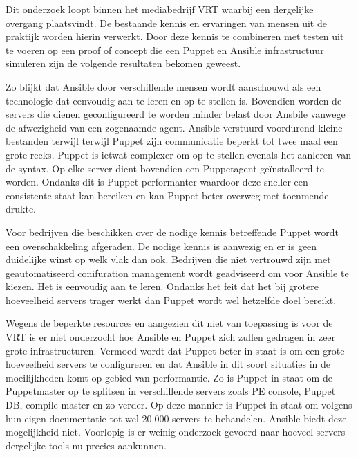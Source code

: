 Dit onderzoek loopt binnen het mediabedrijf VRT waarbij een dergelijke overgang plaatsvindt. De bestaande kennis en ervaringen van mensen uit de praktijk worden hierin verwerkt. Door deze kennis te combineren met testen uit te voeren op een proof of concept die een Puppet en Ansible infrastructuur simuleren zijn de volgende resultaten bekomen geweest.

Zo blijkt dat Ansible door verschillende mensen wordt aanschouwd als een technologie dat eenvoudig aan te leren en op te stellen is. Bovendien worden de servers die dienen geconfigureerd te worden minder belast door Ansbile vanwege de afwezigheid van een zogenaamde agent. Ansible verstuurd voordurend kleine bestanden terwijl terwijl Puppet zijn communicatie beperkt tot twee maal een grote reeks. Puppet is ietwat complexer om op te stellen evenals het aanleren van de syntax. Op elke server dient bovendien een Puppetagent ge\"installeerd te worden. Ondanks dit is Puppet performanter waardoor deze sneller een consistente staat kan bereiken en kan Puppet beter overweg met toenmende drukte.

Voor bedrijven die beschikken over de nodige kennis betreffende Puppet wordt een overschakkeling afgeraden. De nodige kennis is aanwezig en er is geen duidelijke winst op welk vlak dan ook. Bedrijven die niet vertrouwd zijn met geautomatiseerd conifuration management wordt geadviseerd om voor Ansible te kiezen. Het is eenvoudig aan te leren. Ondanks het feit dat het bij grotere hoeveelheid servers trager werkt dan Puppet wordt wel hetzelfde doel bereikt.


Wegens de beperkte resources en aangezien dit niet van toepassing is voor de VRT is er niet onderzocht hoe Ansible en Puppet zich zullen gedragen in zeer grote infrastructuren. Vermoed wordt dat Puppet beter in staat is om een grote hoeveelheid servers te configureren en dat Ansible in dit soort situaties in de moeilijkheden komt op gebied van performantie. Zo is Puppet in staat om de Puppetmaster op te splitsen in verschillende servers zoals PE console, Puppet DB, compile master en zo verder. Op deze mannier is Puppet in staat om volgens hun eigen documentatie tot wel 20.000 servers te behandelen. Ansible biedt deze mogelijkheid niet. Voorlopig is er weinig onderzoek gevoerd naar hoeveel servers dergelijke tools nu precies aankunnen. 